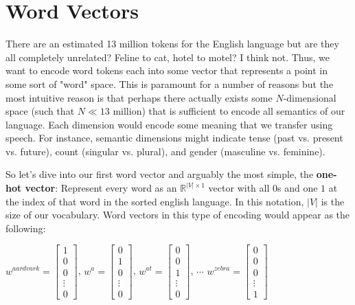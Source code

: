 \documentclass{tufte-handout}
\begin{document}
\section{Word Vectors}\label{sec:wordvectors}

There are an estimated 13 million tokens for the English language but are they all completely unrelated? Feline to cat, hotel to motel? I think not. Thus, we want to encode word tokens each into some vector that represents a point in some sort of "word" space. This is paramount for a number of reasons but the most intuitive reason is that perhaps there actually exists some $N$-dimensional space (such that $N\ll13$ million) that is sufficient to encode all semantics of our language. Each dimension would encode some meaning that we transfer using speech. For instance, semantic dimensions might indicate tense (past vs. present vs. future), count (singular vs. plural), and gender (masculine vs. feminine). 


So let's dive into our first word vector and arguably the most simple, the \textbf{one-hot vector}: Represent every word as an $\mathbb{R}^{|V|\times1}$ vector with all $0$s and one $1$ at the index of that word in the sorted english language. In this notation, $|V|$ is the size of our vocabulary. Word vectors in this type of encoding would appear as the following:

$w^{aardvark} = \left[ \begin{array}{c} 1 \\ 0 \\ 0 \\ \vdots \\ 0 \end{array} \right]$, $w^{a} = \left[ \begin{array}{c} 0 \\ 1 \\ 0 \\ \vdots \\ 0 \end{array} \right] $, $w^{at} = \left[ \begin{array}{c} 0 \\ 0 \\ 1 \\ \vdots \\ 0 \end{array} \right] $, $\cdots$ $w^{zebra} = \left[ \begin{array}{c} 0 \\ 0 \\ 0 \\ \vdots \\ 1 \end{array} \right] $
\end{document}
